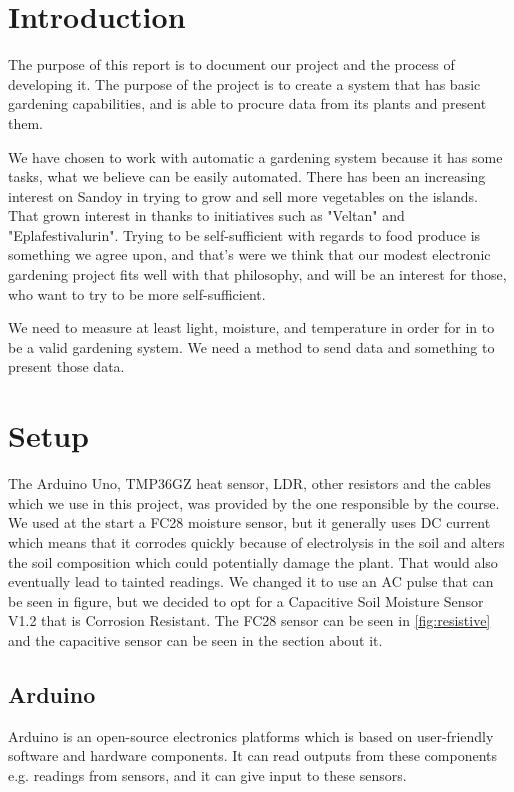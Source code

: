 \documentclass[a4paper,12pt,oneside,openright,titlepage]{book}
\begin{document}
\mainmatter
\chapter{Introduction}

The purpose of this report is to document our project and the process of developing it. The purpose of the project is to create a system that has basic gardening capabilities, and is able to procure data from its plants and present them.

We have chosen to work with automatic a gardening system because it has some tasks, what we believe can be easily automated. There has been an increasing interest on Sandoy in trying to grow and sell more vegetables on the islands. That grown interest in thanks to initiatives such as "Veltan" and "Eplafestivalurin". Trying to be self-sufficient with regards to food produce is something we agree upon, and that's were we think that our modest electronic gardening project fits well with that philosophy, and will be an interest for those, who want to try to be more self-sufficient.

We need to measure at least light, moisture, and temperature in order for in to be a valid gardening system. We need a method to send data and something to present those data.

\chapter{Setup}
The Arduino Uno, TMP36GZ heat sensor, LDR, other resistors and the cables which we use in this project, was provided by the one responsible by the course. We used at the start a FC28 moisture sensor, but it generally uses DC current which means that it corrodes quickly because of electrolysis in the soil and alters the soil composition which could potentially damage the plant. That would also eventually lead to tainted readings. We changed it to use an AC pulse that can be seen in figure, but we decided to opt for a Capacitive Soil Moisture Sensor V1.2 that is Corrosion Resistant. The FC28 sensor can be seen in \ref{fig:resistive} and the capacitive sensor can be seen in the section about it.

\section{Arduino}
Arduino is an open-source electronics platforms which is based on user-friendly software and hardware components\cite{ArduinoIntroduction}. It can read outputs from these components e.g. readings from sensors, and it can give input to these sensors.
\end{document}
